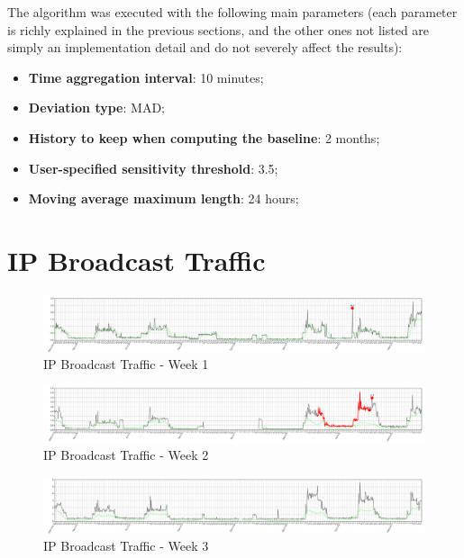 \documentclass[12pt,a4paper,cucitura]{toptesi}
\begin{document}
The algorithm was executed with the following main parameters (each parameter is richly explained in the previous sections, and the other ones not listed are simply an implementation detail and do not severely affect the results):

\begin{itemize}
\item \textbf{Time aggregation interval}: 10 minutes;
\item \textbf{Deviation type}: MAD;
\item \textbf{History to keep when computing the baseline}: 2 months;
\item \textbf{User-specified sensitivity threshold}: 3.5;
\item \textbf{Moving average maximum length}: 24 hours;
\end{itemize}

\section{IP Broadcast Traffic}

\begin{figure}
\centering
\includegraphics[width=\textwidth]{bcast1.png}
\caption{IP Broadcast Traffic - Week 1}
\end{figure}

\begin{figure}
\centering
\includegraphics[width=\textwidth]{bcast2.png}
\caption{IP Broadcast Traffic - Week 2}
\end{figure}

\begin{figure}
\centering
\includegraphics[width=\textwidth]{bcast3.png}
\caption{IP Broadcast Traffic - Week 3}
\end{figure}
\end{document}
